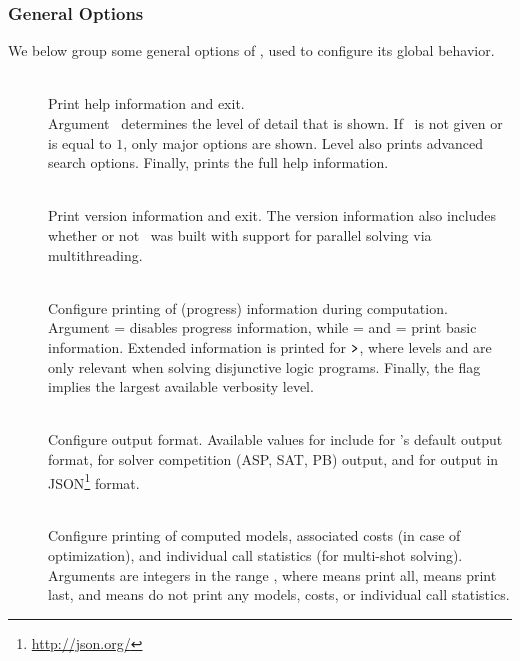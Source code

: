 \subsubsection{General Options}\label{subsec:clasp:general}
We below group some general options of \clasp,
used to configure its global behavior.
\begin{description}
  \item[]~\\
    Print help information and exit.\\
    Argument~ determines the level
    of detail that is shown. If~ is not given
    or is equal to $1$, only major options are shown. Level
     also prints advanced search options. Finally,
     prints the full help information.
  \item[]~\\
    Print version information and exit.
    The version information also includes
    whether or not \clasp\ was built with support for
    parallel solving via multithreading.
  \item[]~\\
    Configure printing of (progress) information during computation.
    Argument = disables progress information, while
    = and = print basic information.
    Extended information is printed for $\texttt{>}$, where levels  and 
    are only relevant when solving disjunctive logic programs.
    Finally, the flag  implies the largest available verbosity level.
  \item[]~\\
    Configure output format. Available values for  include
     for \clasp's default output format,  for
    solver competition (ASP, SAT, PB) output, and  for
    output in JSON\footnote{\url{http://json.org/}} format.
  \item[]~\\
    Configure printing of computed models, associated costs (in case of optimization), and individual call statistics (for multi-shot solving).
    Arguments are integers in the range ,
    where  means print all,  means print last, and  means do not print any models, costs, or individual call statistics.

\end{description}
